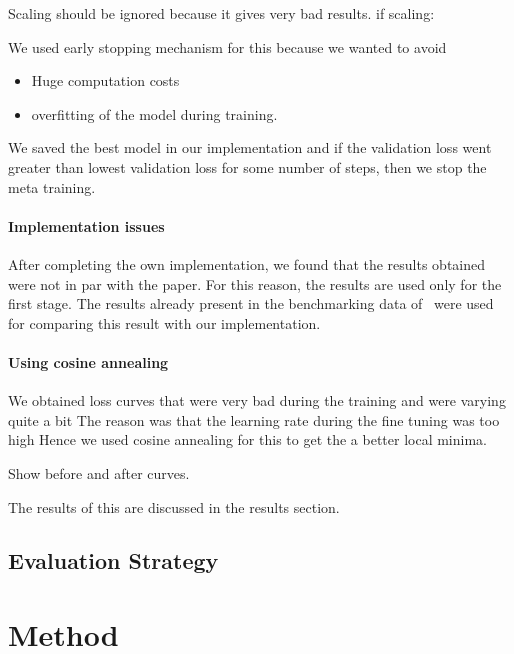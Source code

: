 \documentclass[11pt]{report}
\begin{document}
Scaling should be ignored because it gives very bad results.
if scaling:


We used early stopping mechanism for this because we wanted to avoid
\begin{itemize}
\item Huge computation costs
\item overfitting of the model during training.
\end{itemize}
We saved the best model in our implementation and if the validation loss went greater than
lowest validation loss for some number of steps,  then we stop the meta training.

\subsubsection{Implementation issues}
After completing the own implementation,  we found that the results obtained were not in par with the paper.
For this reason, the results are used only for the first stage.
The results already present in the benchmarking data of~\cite{pineda2021hpob} were used for comparing this result with our implementation.

\subsubsection{Using cosine annealing }
We obtained loss curves that were very bad during the training and were varying quite a bit
The reason was that the learning rate during the fine tuning was too high
Hence we used cosine annealing for this to get the a better local minima.

Show before and after curves.


The results of this are discussed in the results section.


\section{Evaluation Strategy}



\chapter{Method}\label{chap:ProposedIdea}
\end{document}

